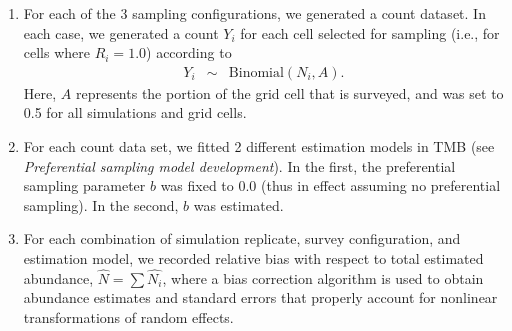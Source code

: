 \documentclass[times,mee,doublespace,]{besauth2}
\begin{document}
\begin{flushleft}
\begin{enumerate}
  \item For each of the 3 sampling configurations, we generated a count dataset.  In each case, we generated a count $Y_i$ for each cell selected for sampling (i.e., for cells where $R_i=1.0$) according to 
      \begin{eqnarray*}
        Y_i & \sim & \textrm{Binomial}(N_i,A).
      \end{eqnarray*}
      Here, $A$ represents the portion of the grid cell that is surveyed, and was set to 0.5 for all simulations and grid cells.
  \item For each count data set, we fitted 2 different estimation models in TMB (see \textit{Preferential sampling model development}).  In the first, the preferential sampling parameter $b$ was fixed to 0.0 (thus in effect assuming no preferential sampling).  In the second, $b$ was estimated.
  \item For each combination of simulation replicate, survey configuration, and estimation model, we recorded relative bias with respect to total estimated abundance, $\hat{N} = \sum \hat{N_i}$, where a bias correction algorithm \citep{TierneyEtAl1989,ThorsonKristensenInPress} is used to obtain abundance estimates and standard errors that properly account for nonlinear transformations of random effects.
\end{enumerate}





\pagebreak


\end{flushleft}
\end{document}
